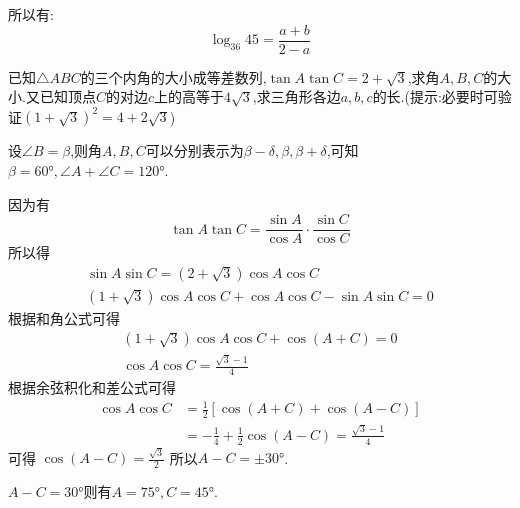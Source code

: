 \begin{questions}
\begin{solution}
		所以有:
		\begin{equation*}
			\log_{36}{45} = \frac{a+b}{2-a}
		\end{equation*}

	\end{solution}

	\question[20] 已知$\triangle{ABC}$的三个内角的大小成等差数列,$\tan{A}\tan{C}=2+\sqrt{3}$,求角$A,B,C$的大小.又已知顶点$C$的对边$c$上的高等于$4\sqrt{3}$,求三角形各边$a,b,c$的长.(提示:必要时可验证$(1+\sqrt{3})^2=4+2\sqrt{3}$)

	\begin{solution}
		设$\angle{B}=\beta$,则角$A,B,C$可以分别表示为$\beta-\delta, \beta, \beta + \delta$,可知$\beta=\ang{60},
			\angle{A}+\angle{C} = \ang{120}$.

		因为有
		\begin{equation*}
			\tan{A}\tan{C}  = \frac{\sin{A}}{\cos{A}}\cdot\frac{\sin{C}}{\cos{C}}
		\end{equation*}
		所以得
		\begin{align*}
			\sin{A}\sin{C} = (2+\sqrt{3})\cos{A}\cos{C} \\
			(1+\sqrt{3})\cos{A}\cos{C} + \cos{A}\cos{C} - \sin{A}\sin{C} = 0
		\end{align*}
		根据和角公式可得
		\begin{align*}
			(1+\sqrt{3})\cos{A}\cos{C} + \cos(A+C)= 0 \\
			\cos{A}\cos{C} = \frac{\sqrt{3}-1}{4}
		\end{align*}
		根据余弦积化和差公式可得
		\begin{align*}
			\cos{A}\cos{C} & = \frac12[\cos(A+C)+\cos(A-C)]                        \\
			               & = -\frac14 + \frac12\cos(A-C)  = \frac{\sqrt{3}-1}{4}
		\end{align*}
		可得
		\begin{math}
			\cos(A-C) = \frac{\sqrt{3}}{2}
		\end{math}
		所以$A-C=\pm\ang{30}$.
		\begin{penum}
			\item $A-C=\ang{30}$则有$A=\ang{75}, C=\ang{45}$.
			      \begin{center}
\end{center}
\end{penum}
\end{solution}
\end{questions}
